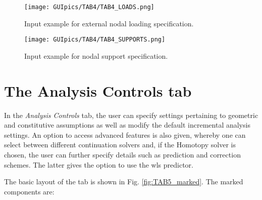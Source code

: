\begin{appendices}
\begin{figure}
	\centering
	\texttt{[image: GUIpics/TAB4/TAB4\_LOADS.png]}
	\caption{Input example for external nodal loading specification.}
	\label{fig:TAB4_LOADS}
\end{figure}

\begin{figure}
	\centering
	\texttt{[image: GUIpics/TAB4/TAB4\_SUPPORTS.png]}
	\caption{Input example for nodal support specification.}
	\label{fig:TAB4_SUPPORTS}
\end{figure}

\section*{The Analysis Controls tab}

In the \textit{Analysis Controls} tab, the user can specify settings pertaining 
to geometric and constitutive assumptions as well as modify the default 
incremental analysis settings. An option to access advanced features is also 
given, whereby one can select between different continuation solvers and, if 
the Homotopy solver is chosen, the user can further specify details such as 
prediction and correction schemes. The latter gives the option to use the 
\acrshort{wls} predictor. 

The basic layout of the tab is shown in Fig. \ref{fig:TAB5_marked}. The marked 
components are:


\end{appendices}
